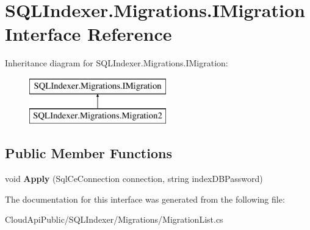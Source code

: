 \hypertarget{interface_s_q_l_indexer_1_1_migrations_1_1_i_migration}{\section{S\-Q\-L\-Indexer.\-Migrations.\-I\-Migration Interface Reference}
\label{interface_s_q_l_indexer_1_1_migrations_1_1_i_migration}
}
Inheritance diagram for S\-Q\-L\-Indexer.\-Migrations.\-I\-Migration\-:\begin{figure}[H]
\begin{center}
\leavevmode
\includegraphics[height=2.000000cm]{interface_s_q_l_indexer_1_1_migrations_1_1_i_migration}
\end{center}
\end{figure}
\subsection*{Public Member Functions}
\begin{DoxyCompactItemize}
\item 
\hypertarget{interface_s_q_l_indexer_1_1_migrations_1_1_i_migration_aae501f6517c6782703a8a2c67003bae1}{void {\bfseries Apply} (Sql\-Ce\-Connection connection, string index\-D\-B\-Password)}\label{interface_s_q_l_indexer_1_1_migrations_1_1_i_migration_aae501f6517c6782703a8a2c67003bae1}

\end{DoxyCompactItemize}


The documentation for this interface was generated from the following file\-:\begin{DoxyCompactItemize}
\item 
Cloud\-Api\-Public/\-S\-Q\-L\-Indexer/\-Migrations/Migration\-List.\-cs\end{DoxyCompactItemize}
